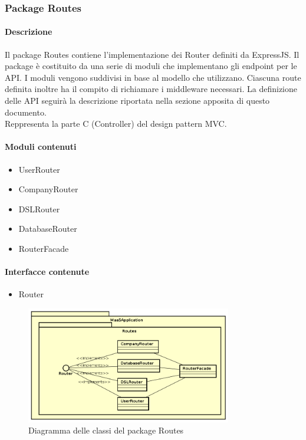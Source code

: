 \subsubsection{Package Routes}
\paragraph*{Descrizione}
Il package Routes contiene l'implementazione dei Router definiti da ExpressJS. Il package è costituito da una serie di moduli che implementano gli endpoint per le API.
I moduli vengono suddivisi in base al modello che utilizzano. Ciascuna route definita inoltre ha il compito di richiamare i middleware necessari.
La definizione delle API seguirà la descrizione riportata nella sezione apposita di questo documento.\\
Reppresenta la parte C (Controller) del design pattern MVC.

\paragraph*{Moduli contenuti}
\begin{itemize}
\item UserRouter
\item CompanyRouter
\item DSLRouter
\item DatabaseRouter
\item RouterFacade
\end{itemize}

\paragraph*{Interfacce contenute}
\begin{itemize}
\item Router
\end{itemize}

\begin{figure}[H]
\centering
\includegraphics[width=0.8\textwidth]{res/sections/backend/routes.png}
\caption{Diagramma delle classi del package Routes}
\end{figure}

